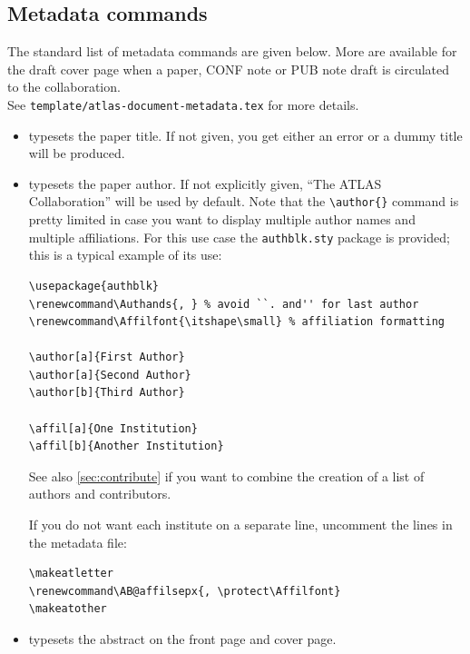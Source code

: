 \subsection{Metadata commands}

The standard list of metadata commands are given below.
More are available for the draft cover page when a paper, CONF note or PUB note draft
is circulated to the collaboration.\\
See \texttt{template/atlas-document-metadata.tex} for more details.

\begin{itemize}
  \item {} typesets the paper title. If not
    given, you get either an error or a dummy title will be produced.

  \item {} typesets the paper author. If not
    explicitly given, \enquote{The ATLAS Collaboration} will be used by
    default. Note that the \verb|\author{}| command is pretty limited
    in case you want to display multiple author names and multiple
    affiliations. For this use case the \verb|authblk.sty| package is
    provided; this is a typical example of its use:
    \begin{verbatim}
\usepackage{authblk}
\renewcommand\Authands{, } % avoid ``. and'' for last author
\renewcommand\Affilfont{\itshape\small} % affiliation formatting

\author[a]{First Author}
\author[a]{Second Author}
\author[b]{Third Author}

\affil[a]{One Institution}
\affil[b]{Another Institution}
    \end{verbatim}
    See also \cref{sec:contribute} if you want to combine the creation of a list of authors and contributors.

    If you do not want each institute on a separate line, uncomment the lines in the metadata file:
    \begin{verbatim}
\makeatletter
\renewcommand\AB@affilsepx{, \protect\Affilfont}
\makeatother
    \end{verbatim}


  \item {} typesets the
    abstract on the front page and cover page.


\end{itemize}
